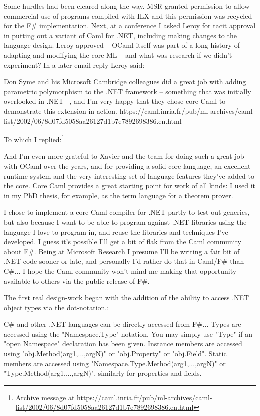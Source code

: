 \documentclass[acmsmall]{acmart}\settopmatter{}
\begin{document}
Some hurdles had been cleared along the way. MSR granted permission to allow commercial use of programs compiled with ILX and this permission was recycled for the F\# implementation. Next, at a conference I asked Leroy for tacit approval in putting out a variant of Caml for .NET, including making changes to the language design.  Leroy approved – OCaml itself was part of a long history of adapting and modifying the core ML – and what was research if we didn’t experiment?  In a later email reply Leroy said:

\begin{verbquote}
Don Syme and his Microsoft Cambridge colleagues did a great job with adding parametric polymorphism to the .NET framework -- something that was initially overlooked in .NET --, and I'm very happy that they chose core Caml to demonstrate this extension in action. https://caml.inria.fr/pub/ml-archives/caml-list/2002/06/8d07fd5058aa26127d1b7e7892698386.en.html 
\end{verbquote}
To which I replied:\footnote{Archive message at \url{https://caml.inria.fr/pub/ml-archives/caml-list/2002/06/8d07fd5058aa26127d1b7e7892698386.en.html}}
\begin{verbquote}
And I'm even more grateful to Xavier and the team for doing such a great job with OCaml over the years, and for providing a solid core language, an excellent runtime system and the very interesting set of language features they've added to the core.  Core Caml provides a great starting point for work of all kinds: I used it in my PhD thesis, for example, as the term language for a theorem prover.

I chose to implement a core Caml compiler for .NET partly to test out generics, but also because I want to be able to program against .NET libraries using the language I love to program in, and reuse the libraries and techniques I've developed.  I guess it's possible I'll get a bit of flak from the Caml community about F#.  Being at Microsoft Research I presume I'll be writing a fair bit of .NET code sooner or late, and personally I'd rather do that in Caml/F# than C#... I hope the Caml community won't mind me making that opportunity available to others via the public release of F#.  
\end{verbquote}
The first real design-work began with the addition of the ability to access .NET object types via the dot-notation.:
\begin{verbquote}
C# and other .NET languages can be directly accessed from F#...  Types are accessed using the "Namespace.Type" notation.  You may simply use "Type" if an "open Namespace" declaration has been given. Instance members are accessed using "obj.Method(arg1,...,argN)" or "obj.Property" or "obj.Field". Static members are accessed using "Namespace.Type.Method(arg1,...,argN)" or "Type.Method(arg1,...,argN)", similarly for properties and fields. 
\end{verbquote}
\end{document}
